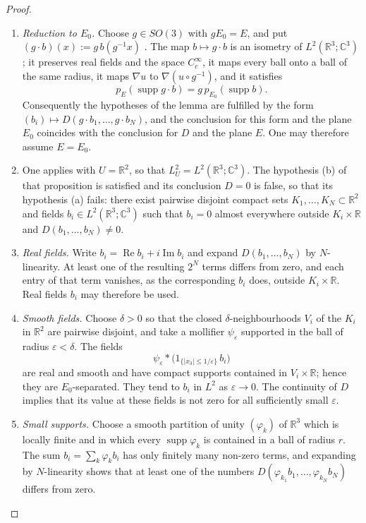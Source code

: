 \documentclass[11pt]{amsart}
\theoremstyle{definition}
\begin{document}
\begin{proof}
\begin{enumerate}
\item[1.] \emph{Reduction to $E_0$.}
Choose $g\in SO(3)$ with $gE_0=E$, and put $(g\cdot b)(x):=g\,b(g^{-1}x)$ \cite[Definition~14.1]{QEDII}.
The map $b\mapsto g\cdot b$ is an isometry of $L^2(\mathbb{R}^3;\mathbb{C}^3)$; it preserves real fields and the space $C_c^\infty$, it maps every ball onto a ball of the same radius, it maps $\nabla u$ to $\nabla(u\circ g^{-1})$, and it satisfies
\begin{equation*}
p_E(\operatorname{supp}g\cdot b)=g\,p_{E_0}(\operatorname{supp}b).
\end{equation*}
Consequently the hypotheses of the lemma are fulfilled by the form $(b_i)\mapsto D(g\cdot b_1,\dots,g\cdot b_N)$, and the conclusion for this form and the plane $E_0$ coincides with the conclusion for $D$ and the plane $E$.
One may therefore assume $E=E_0$.
\item[2.]
One applies \cite[Proposition~14.13]{QEDII} with $U=\mathbb{R}^2$, so that $L^2_U=L^2(\mathbb{R}^3;\mathbb{C}^3)$.
The hypothesis (b) of that proposition is satisfied and its conclusion $D=0$ is false, so that its hypothesis (a) fails: there exist pairwise disjoint compact sets $K_1,\dots,K_N\subset\mathbb{R}^2$ and fields $b_i\in L^2(\mathbb{R}^3;\mathbb{C}^3)$ such that $b_i=0$ almost everywhere outside $K_i\times\mathbb{R}$ and $D(b_1,\dots,b_N)\neq0$.
\item[3.] \emph{Real fields.}
Write $b_i=\operatorname{Re}b_i+i\operatorname{Im}b_i$ and expand $D(b_1,\dots,b_N)$ by $N$-linearity.
At least one of the resulting $2^N$ terms differs from zero, and each entry of that term vanishes, as the corresponding $b_i$ does, outside $K_i\times\mathbb{R}$.
Real fields $b_i$ may therefore be used.
\item[4.] \emph{Smooth fields.}
Choose $\delta>0$ so that the closed $\delta$-neighbourhoods $V_i$ of the $K_i$ in $\mathbb R^2$ are pairwise disjoint, and take a mollifier $\psi_\varepsilon$ supported in the ball of radius $\varepsilon<\delta$.
The fields
\begin{equation*}
\psi_\varepsilon*\bigl(1_{\{|x_3|\le1/\varepsilon\}}\,b_i\bigr)
\end{equation*}
are real and smooth and have compact supports contained in $V_i\times\mathbb{R}$; hence they are $E_0$-separated.
They tend to $b_i$ in $L^2$ as $\varepsilon\to0$.
The continuity of $D$ implies that its value at these fields is not zero for all sufficiently small $\varepsilon$.
\item[5.] \emph{Small supports.}
Choose a smooth partition of unity $(\varphi_k)$ of $\mathbb{R}^3$ which is locally finite and in which every $\operatorname{supp}\varphi_k$ is contained in a ball of radius $r$.
The sum $b_i=\sum_k\varphi_kb_i$ has only finitely many non-zero terms, and expanding by $N$-linearity shows that at least one of the numbers $D(\varphi_{k_1}b_1,\dots,\varphi_{k_N}b_N)$ differs from zero.
\end{enumerate}
\end{proof}
\end{document}
